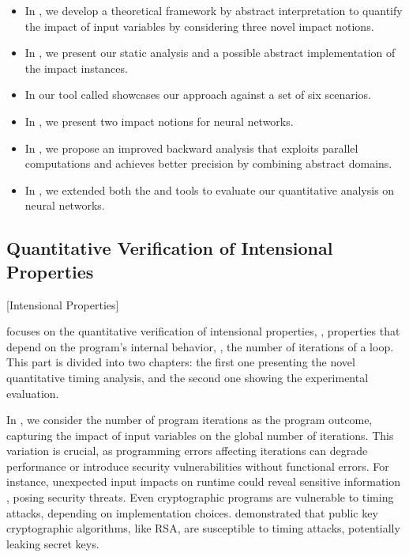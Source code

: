 \begin{itemize}
  \item In , we develop a theoretical framework by abstract interpretation to quantify the impact of input variables by considering three novel impact notions.
  \item In , we present our static analysis and a possible abstract implementation of the impact instances.
  \item In  our tool called \impatto showcases our approach against a set of six scenarios.
  \item In , we present two impact notions for neural networks.
  \item In , we propose an improved backward analysis that exploits parallel computations and achieves better precision by combining abstract domains.
  \item In , we extended both the \impatto{} and \libra\sidenote{\libraurl} tools to evaluate our quantitative analysis on neural networks.
\end{itemize}

\subsection{Quantitative Verification of Intensional Properties}[Intensional Properties]


 focuses on the quantitative verification of intensional properties, \ie, properties that depend on the program's internal behavior, \eg, the number of iterations of a loop.
This part is divided into two chapters: the first one presenting the novel quantitative timing analysis, and the second one showing the experimental evaluation.

In , we consider the number of program iterations as the program outcome, capturing the impact of input variables on the global number of iterations.
This variation is crucial, as programming errors affecting iterations can degrade performance or introduce security vulnerabilities without functional errors.
For instance, unexpected input impacts on runtime could reveal sensitive information , posing security threats.
Even cryptographic programs are vulnerable to timing attacks, depending on implementation choices.
 demonstrated that public key cryptographic algorithms, like RSA, are susceptible to timing attacks, potentially leaking secret keys.

